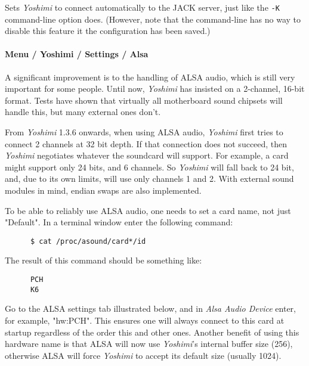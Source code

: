    Sets \textsl{Yoshimi} to connect automatically to the JACK server, just like
   the \texttt{-K} command-line option does.  (However, note that the
   command-line has no way to disable this feature it the configuration has been
   saved.)

\paragraph{Menu / Yoshimi / Settings / Alsa}
\label{paragraph:menu_yoshimi_settings_alsa_tab}

   A significant improvement is to the handling of ALSA audio, which is still
   very important for some people. Until now, \textsl{Yoshimi} has insisted
   on a 2-channel, 16-bit format. Tests have shown that virtually all
   motherboard sound chipsets will handle this, but many external ones don't.

   From \textsl{Yoshimi} 1.3.6 onwards, when using ALSA audio,
   \textsl{Yoshimi} first tries to connect 2 channels at 32 bit depth.  If
   that connection does not succeed, then \textsl{Yoshimi} negotiates
   whatever the soundcard will support.  For example, a card might support
   only 24 bits, and 6 channels.  So \textsl{Yoshimi} will fall back to
   24 bit, and, due to its own limits, will use only channels 1 and 2.
   With external sound modules in mind, endian swaps are also implemented.

   To be able to reliably use ALSA audio, one needs to set a card name, not just
   "Default".  In a terminal window enter the following command:

   \begin{verbatim}
      $ cat /proc/asound/card*/id
   \end{verbatim}

   The result of this command should be something like:

   \begin{verbatim}
      PCH
      K6
   \end{verbatim}

   Go to the ALSA settings tab illustrated below, and in 
   \textsl{Alsa Audio Device} enter, for example, "hw:PCH".
   This ensures one will always connect to this card at startup regardless of
   the order this and other ones.  Another benefit of using this hardware name
   is that ALSA will now use \textsl{Yoshimi}'s internal
   buffer size (256), otherwise ALSA will force \textsl{Yoshimi} to accept its
   default size (usually 1024).

